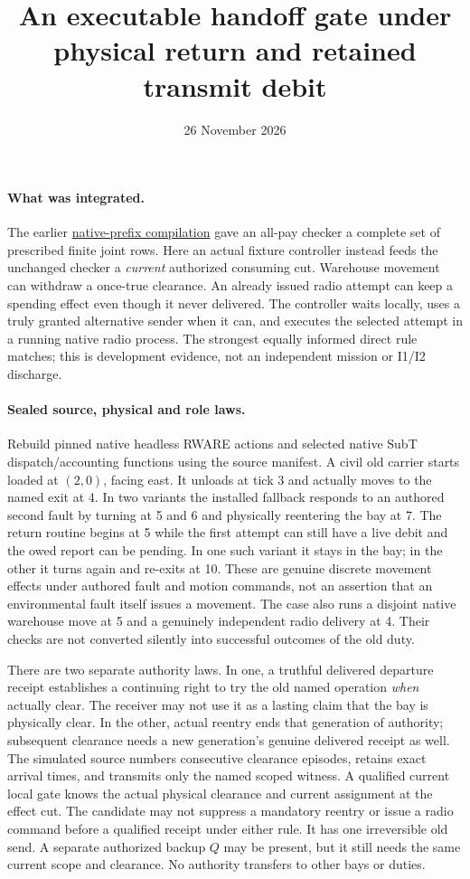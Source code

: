 \documentclass{article}
\title{An executable handoff gate under physical return and retained transmit debit}
\date{26 November 2026}
\begin{document}
\maketitle
\paragraph{What was integrated.}
The earlier
\href{https://github.com/eternal-november/eos-research-programmes/pull/627}{native-prefix compilation}
gave an all-pay checker a complete set of prescribed finite joint rows.
Here an actual fixture controller instead feeds the unchanged checker
a \emph{current} authorized consuming cut. Warehouse movement can
withdraw a once-true clearance. An already issued radio attempt
can keep a spending effect even though it never delivered. The
controller waits locally, uses a truly granted alternative sender
when it can, and executes the selected attempt in a running native
radio process. The strongest equally informed direct rule matches;
this is development evidence, not an independent mission or I1/I2
discharge.

\paragraph{Sealed source, physical and role laws.}
Rebuild pinned native headless RWARE actions and selected native
SubT dispatch/accounting functions using the source manifest.
A civil old carrier starts loaded at \((2,0)\), facing east. It
unloads at tick 3 and actually moves to the named exit at 4.
In two variants the installed fallback responds to an authored
second fault by turning at 5 and 6 and physically reentering
the bay at 7. The return routine begins at 5 while the first
attempt can still have a live debit and the owed report can be pending. In one such variant it stays in the bay; in the
other it turns again and re-exits at 10. These are genuine
discrete movement effects under authored fault and motion
commands, not an assertion that an environmental fault itself
issues a movement. The case also runs a disjoint native
warehouse move at 5 and a genuinely independent radio delivery
at 4. Their checks are not converted silently into successful
outcomes of the old duty.

There are two separate authority laws. In one, a truthful
delivered departure receipt establishes a continuing right to try
the old named operation \emph{when} actually clear. The receiver
may not use it as a lasting claim that the bay is physically clear.
In the other, actual reentry ends that generation of authority;
subsequent clearance needs a new generation's genuine delivered
receipt as well. The simulated source numbers consecutive clearance
episodes, retains exact arrival times, and transmits only the named
scoped witness. A qualified current local gate knows the actual
physical clearance and current assignment at the effect cut.
The candidate may not suppress a mandatory reentry or issue a radio
command before a qualified receipt under either rule. It has one
irreversible old send. A separate authorized backup \(Q\) may be
present, but it still needs the same current scope and clearance.
No authority transfers to other bays or duties.
\end{document}
